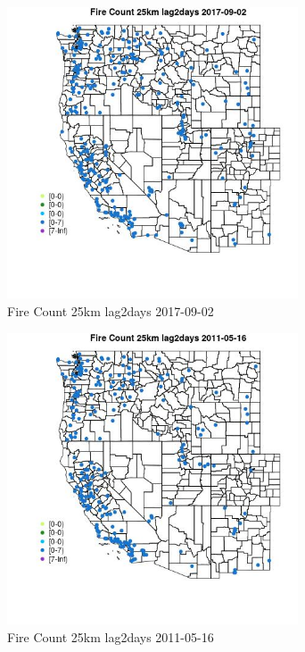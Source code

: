\begin{figure} 
\centering  
\includegraphics[width=0.77\textwidth]{Code_Outputs/Report_ML_input_PM25_Step4_part_e_de_duplicated_aves_compiled_2019-05-20wNAs_MapObsFire_Count_25km_lag2days2017-09-02.jpg} 
\caption{\label{fig:Report_ML_input_PM25_Step4_part_e_de_duplicated_aves_compiled_2019-05-20wNAsMapObsFire_Count_25km_lag2days2017-09-02}Fire Count 25km lag2days 2017-09-02} 
\end{figure} 
 

\begin{figure} 
\centering  
\includegraphics[width=0.77\textwidth]{Code_Outputs/Report_ML_input_PM25_Step4_part_e_de_duplicated_aves_compiled_2019-05-20wNAs_MapObsFire_Count_25km_lag2days2011-05-16.jpg} 
\caption{\label{fig:Report_ML_input_PM25_Step4_part_e_de_duplicated_aves_compiled_2019-05-20wNAsMapObsFire_Count_25km_lag2days2011-05-16}Fire Count 25km lag2days 2011-05-16} 
\end{figure} 
 

